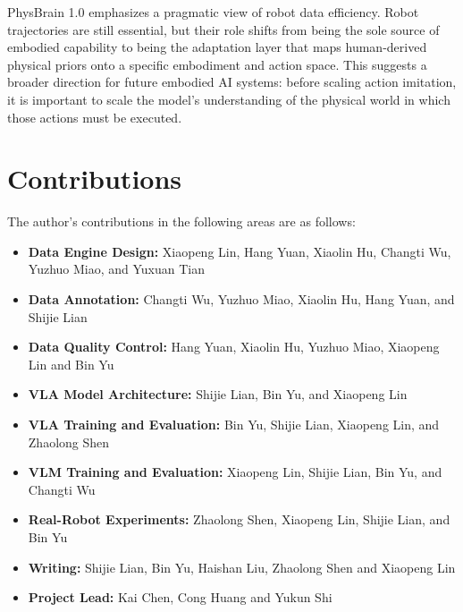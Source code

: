 PhysBrain 1.0 emphasizes a pragmatic view of robot data efficiency. Robot trajectories are still essential, but their role shifts from being the sole source of embodied capability to being the adaptation layer that maps human-derived physical priors onto a specific embodiment and action space. This suggests a broader direction for future embodied AI systems: before scaling action imitation, it is important to scale the model's understanding of the physical world in which those actions must be executed.

\section{Contributions}
\label{sec:contributions}


The author's contributions in the following areas are as follows:

\begin{itemize}
    \item \textbf{Data Engine Design:} Xiaopeng Lin, Hang Yuan, Xiaolin Hu, Changti Wu, Yuzhuo Miao, and Yuxuan Tian
    \item \textbf{Data Annotation:} Changti Wu, Yuzhuo Miao, Xiaolin Hu, Hang Yuan, and Shijie Lian
    \item \textbf{Data Quality Control:} Hang Yuan, Xiaolin Hu, Yuzhuo Miao, Xiaopeng Lin and Bin Yu
    \item \textbf{VLA Model Architecture:} Shijie Lian, Bin Yu, and Xiaopeng Lin
    \item \textbf{VLA Training and Evaluation:} Bin Yu, Shijie Lian, Xiaopeng Lin, and Zhaolong Shen
    \item \textbf{VLM Training and Evaluation:} Xiaopeng Lin, Shijie Lian, Bin Yu, and Changti Wu
    \item \textbf{Real-Robot Experiments:} Zhaolong Shen, Xiaopeng Lin, Shijie Lian, and Bin Yu
    \item \textbf{Writing:} Shijie Lian, Bin Yu, Haishan Liu, Zhaolong Shen and Xiaopeng Lin
    \item \textbf{Project Lead:} Kai Chen{\renewcommand{\thefootnote}{\fnsymbol{footnote}}\footnotemark[1]}, Cong Huang and Yukun Shi
\end{itemize}

\begingroup
\renewcommand{\thefootnote}{\fnsymbol{footnote}}
\endgroup
